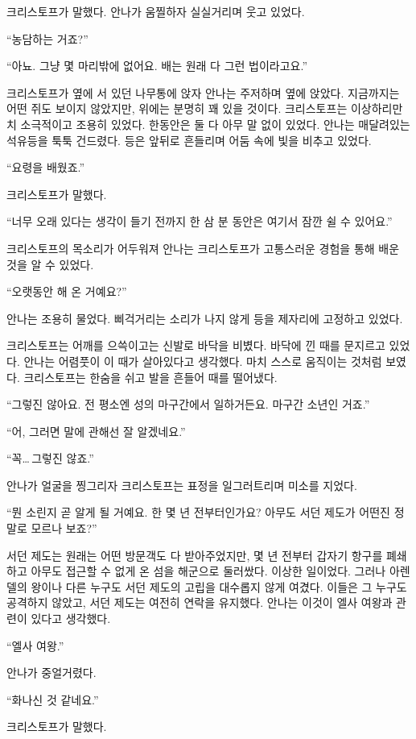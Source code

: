 크리스토프가 말했다. 안나가 움찔하자 실실거리며 웃고 있었다.

``농담하는 거죠?''

``아뇨. 그냥 몇 마리밖에 없어요. 배는 원래 다 그런 법이라고요.''

크리스토프가 옆에 서 있던 나무통에 앉자 안나는 주저하며 옆에 앉았다. 지금까지는 어떤 쥐도 보이지 않았지만, 위에는 분명히 꽤 있을 것이다. 크리스토프는 이상하리만치 소극적이고 조용히 있었다. 한동안은 둘 다 아무 말 없이 있었다. 안나는 매달려있는 석유등을 툭툭 건드렸다. 등은 앞뒤로 흔들리며 어둠 속에 빛을 비추고 있었다.

``요령을 배웠죠.''

크리스토프가 말했다.

``너무 오래 있다는 생각이 들기 전까지 한 삼 분 동안은 여기서 잠깐 쉴 수 있어요.''

크리스토프의 목소리가 어두워져 안나는 크리스토프가 고통스러운 경험을 통해 배운 것을 알 수 있었다.

``오랫동안 해 온 거예요?''

안나는 조용히 물었다. 삐걱거리는 소리가 나지 않게 등을 제자리에 고정하고 있었다.

크리스토프는 어깨를 으쓱이고는 신발로 바닥을 비볐다. 바닥에 낀 때를 문지르고 있었다. 안나는 어렴풋이 이 때가 살아있다고 생각했다. 마치 스스로 움직이는 것처럼 보였다. 크리스토프는 한숨을 쉬고 발을 흔들어 때를 떨어냈다.

``그렇진 않아요. 전 평소엔 성의 마구간에서 일하거든요. 마구간 소년인 거죠.''

``어, 그러면 말에 관해선 잘 알겠네요.''

``꼭\ldots\,그렇진 않죠.''

안나가 얼굴을 찡그리자 크리스토프는 표정을 일그러트리며 미소를 지었다.

``뭔 소린지 곧 알게 될 거예요. 한 몇 년 전부터인가요? 아무도 서던 제도가 어떤진 정말로 모르나 보죠?''

서던 제도는 원래는 어떤 방문객도 다 받아주었지만, 몇 년 전부터 갑자기 항구를 폐쇄하고 아무도 접근할 수 없게 온 섬을 해군으로 둘러쌌다. 이상한 일이었다. 그러나 아렌델의 왕이나 다른 누구도 서던 제도의 고립을 대수롭지 않게 여겼다. 이들은 그 누구도 공격하지 않았고, 서던 제도는 여전히 연락을 유지했다. 안나는 이것이 엘사 여왕과 관련이 있다고 생각했다.

``엘사 여왕.''

안나가 중얼거렸다.

``화나신 것 같네요.''

크리스토프가 말했다.

